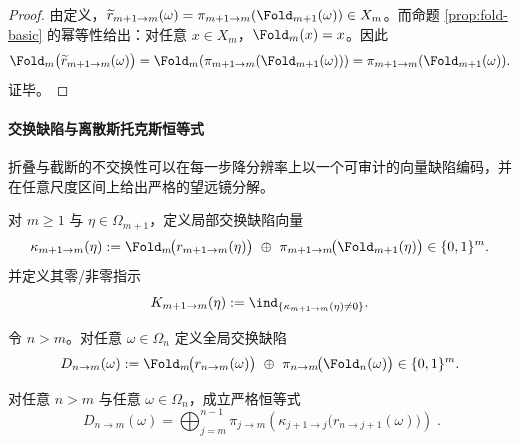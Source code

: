 \begin{proof}
由定义，$\widetilde r_{m+1\to m}(\omega)=\pi_{m+1\to m}(\Fold_{m+1}(\omega))\in X_m$。而命题 \ref{prop:fold-basic} 的幂等性给出：对任意 $x\in X_m$，$\Fold_m(x)=x$。因此
\[
\Fold_m\bigl(\widetilde r_{m+1\to m}(\omega)\bigr)
=\Fold_m\!\left(\pi_{m+1\to m}(\Fold_{m+1}(\omega))\right)
=\pi_{m+1\to m}(\Fold_{m+1}(\omega)).
\]
证毕。
\end{proof}

\paragraph{交换缺陷与离散斯托克斯恒等式}
折叠与截断的不交换性可以在每一步降分辨率上以一个可审计的向量缺陷编码，并在任意尺度区间上给出严格的望远镜分解。

\begin{definition}[局部交换缺陷与曲率指示]\label{def:fold-local-curvature-defect}
对 \(m\ge 1\) 与 \(\eta\in\Omega_{m+1}\)，定义局部交换缺陷向量
\[
\kappa_{m+1\to m}(\eta)
:=\Fold_m\!\bigl(r_{m+1\to m}(\eta)\bigr)\ \oplus\ \pi_{m+1\to m}\!\bigl(\Fold_{m+1}(\eta)\bigr)
\in \{0,1\}^{m}.
\]
并定义其零/非零指示
\[
K_{m+1\to m}(\eta):=\ind_{\{\kappa_{m+1\to m}(\eta)\neq 0\}}.
\]
\end{definition}

\begin{definition}[全局交换缺陷]\label{def:fold-global-stokes-defect}
令 \(n>m\)。对任意 \(\omega\in\Omega_n\) 定义全局交换缺陷
\[
D_{n\to m}(\omega)
:=\Fold_m\!\bigl(r_{n\to m}(\omega)\bigr)\ \oplus\ \pi_{n\to m}\!\bigl(\Fold_n(\omega)\bigr)
\in \{0,1\}^{m}.
\]
\end{definition}

\begin{theorem}[折叠--截断塔上的离散广义斯托克斯恒等式]\label{thm:fold-discrete-stokes-defect}
对任意 \(n>m\) 与任意 \(\omega\in\Omega_n\)，成立严格恒等式
\[
\boxed{\;
D_{n\to m}(\omega)
=\bigoplus_{j=m}^{n-1}
\pi_{j\to m}\!\left(
\kappa_{j+1\to j}\!\bigl(r_{n\to j+1}(\omega)\bigr)
\right)\; }.
\]
\end{theorem}

